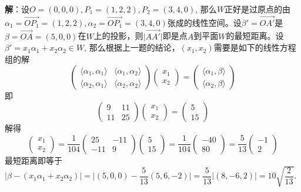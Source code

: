 \newpageorvspace

{\bf 解}：设$O = (0,0,0), P_1 = (1,2,2), P_2 = (3,4,0)$, 那么$W$正好是过原点的由$\alpha_1 = \overrightarrow{OP_1} = (1,2,2), \alpha_2 = \overrightarrow{OP_1} = (3,4,0)$张成的线性空间。设$\beta' = \overrightarrow{OA'}$是$\beta = \overrightarrow{OA} = (5,0,0)$在$W$上的投影，则$\lvert \overrightarrow{AA'} \rvert$即是点$A$到平面$W$的最短距离。设$\beta' = x_1 \alpha_1 + x_2 \alpha_2 \in W$, 那么根据上一题的结论，$(x_1, x_2)$需要是如下的线性方程组的解
$$
\begin{pmatrix}
\langle \alpha_1, \alpha_1 \rangle & \langle \alpha_1, \alpha_2 \rangle \\
\langle \alpha_2, \alpha_1 \rangle & \langle \alpha_2, \alpha_2 \rangle
\end{pmatrix}
\begin{pmatrix}
x_1 \\ x_2
\end{pmatrix} = 
\begin{pmatrix}
\langle \alpha_1, \beta \rangle \\
\langle \alpha_2, \beta \rangle
\end{pmatrix}
$$
即
$$
\begin{pmatrix}
9 & 11 \\ 11 & 25
\end{pmatrix}
\begin{pmatrix}
x_1 \\ x_2
\end{pmatrix} = 
\begin{pmatrix}
5 \\ 15
\end{pmatrix}
$$
解得
$$
\begin{pmatrix}
x_1 \\ x_2
\end{pmatrix} = \dfrac{1}{104} \begin{pmatrix}
25 & -11 \\ -11 & 9
\end{pmatrix}
\begin{pmatrix}
5 \\ 15
\end{pmatrix} = \dfrac{1}{104} \begin{pmatrix}
-40 \\ 80
\end{pmatrix} = \dfrac{5}{13}\begin{pmatrix}
-1 \\ 2
\end{pmatrix}
$$
最短距离即等于$\lvert \beta - (x_1\alpha_1 + x_2\alpha_2) \rvert = \lvert (5,0,0) - \dfrac{5}{13} (5,6,-2) \rvert = \dfrac{5}{13} \lvert (8,-6,2) \rvert = 10 \sqrt{\dfrac{2}{13}}$.

